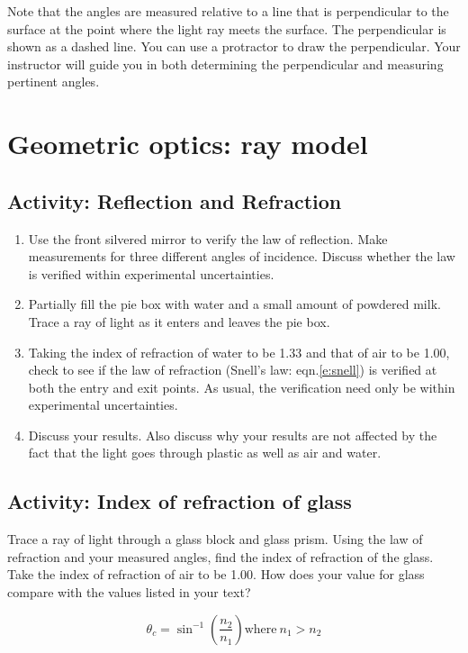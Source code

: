 {Note that the angles are measured relative to a line that is perpendicular to the surface at the point where the light ray meets the surface.  The perpendicular is shown as a dashed line.  You can use a protractor to draw the perpendicular.  Your instructor will guide you in both determining the perpendicular and measuring pertinent angles.

\section{Geometric optics: ray model}

\subsection{Activity: Reflection and Refraction}
\begin{enumerate}
	\item Use the front silvered mirror to verify the law of reflection.  Make measurements for three different angles of incidence.  Discuss whether the law is verified within experimental uncertainties.

	\item Partially fill the pie box with water and a small amount of powdered milk. Trace a ray of light as it enters and leaves the pie box.  
	\item Taking the index of refraction of water to be 1.33 and that of air to be 1.00, check to see if the law of refraction (Snell's law: eqn.\ref{e:snell}) is verified at both the entry and exit points.  As usual, the verification need only be within experimental uncertainties.
	\item Discuss your results. Also discuss why your results are not affected by the fact that the light goes through plastic as well as air and water.
\end{enumerate}
	
\subsection{Activity: Index of refraction of glass}
Trace a ray of light through a glass block and glass prism.  Using the law of refraction and your measured angles, find the index of refraction of the glass.  Take the index of refraction of air to be 1.00.  How does your value for glass compare with the values listed in your text?

\begin{equation} \label{e:critang}
	\theta_c = \sin^{-1} \left(\frac{n_2}{n_1}\right) \text{where} \ n_1 > n_2
\end{equation}
	 

}
